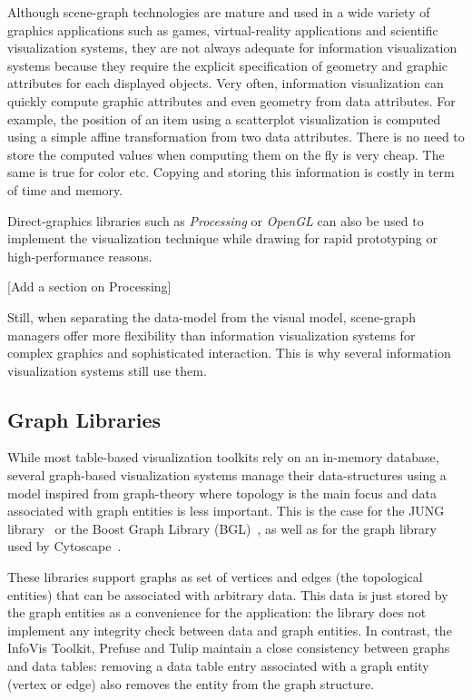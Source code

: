 Although scene-graph technologies are mature and used in a wide
variety of graphics applications such as games, virtual-reality
applications and scientific visualization systems, they are not always
adequate for information visualization systems because they require
the explicit specification of geometry and graphic attributes for each
displayed objects.  Very often, information visualization can quickly
compute graphic attributes and even geometry from data attributes.  For
example, the position of an item using a scatterplot visualization is
computed using a simple affine transformation from two data
attributes.  There is no need to store the computed values when
computing them on the fly is very cheap.  The same is true for color
etc.  Copying and storing this information is costly in term of time
and memory.

Direct-graphics libraries such as \emph{Processing} or \emph{OpenGL}
can also be used to implement the visualization technique while
drawing for rapid prototyping or high-performance reasons.

[Add a section on Processing]

Still, when separating the data-model from the visual model,
scene-graph managers offer more flexibility than information
visualization systems for complex graphics and sophisticated
interaction.  This is why several information visualization systems
still use them.


\subsection{Graph Libraries}

While most table-based visualization toolkits rely on an in-memory
database, several graph-based visualization systems manage their
data-structures using a model inspired from graph-theory where
topology is the main focus and data associated with graph entities is
less important.  This is the case for the JUNG library~\cite{jung2003}
or the Boost Graph Library (BGL)~\cite{BGL}, as well as for the graph
library used by Cytoscape~\cite{Cytoscape}.

These libraries support graphs as set of vertices and edges (the
topological entities) that can be associated with arbitrary data.
This data is just stored by the graph entities as a convenience for
the application: the library does not implement any integrity check
between data and graph entities.  In contrast, the InfoVis Toolkit,
Prefuse and Tulip maintain a close consistency between graphs and data
tables: removing a data table entry associated with a graph entity
(vertex or edge) also removes the entity from the graph structure.

